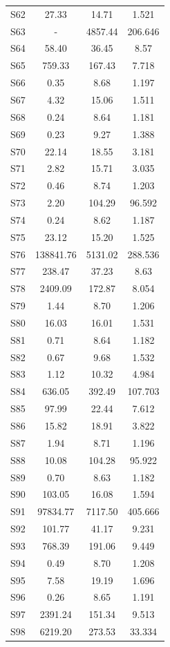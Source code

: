 {\begin{longtable}{l S[table-format=7.2] S[table-format=7.2] S[table-format=7.3]}
S62 & 27.33 & 14.71 & 1.521 \\
S63 & { - } & 4857.44 & 206.646 \\
S64 & 58.40 & 36.45 & 8.57 \\
S65 & 759.33 & 167.43 & 7.718 \\
S66 & 0.35 & 8.68 & 1.197 \\
S67 & 4.32 & 15.06 & 1.511 \\
S68 & 0.24 & 8.64 & 1.181 \\
S69 & 0.23 & 9.27 & 1.388 \\
S70 & 22.14 & 18.55 & 3.181 \\
S71 & 2.82 & 15.71 & 3.035 \\
S72 & 0.46 & 8.74 & 1.203 \\
S73 & 2.20 & 104.29 & 96.592 \\
S74 & 0.24 & 8.62 & 1.187 \\
S75 & 23.12 & 15.20 & 1.525 \\
S76 & 138841.76 & 5131.02 & 288.536 \\
S77 & 238.47 & 37.23 & 8.63 \\
S78 & 2409.09 & 172.87 & 8.054 \\
S79 & 1.44 & 8.70 & 1.206 \\
S80 & 16.03 & 16.01 & 1.531 \\
S81 & 0.71 & 8.64 & 1.182 \\
S82 & 0.67 & 9.68 & 1.532 \\
S83 & 1.12 & 10.32 & 4.984 \\
S84 & 636.05 & 392.49 & 107.703 \\
S85 & 97.99 & 22.44 & 7.612 \\
S86 & 15.82 & 18.91 & 3.822 \\
S87 & 1.94 & 8.71 & 1.196 \\
S88 & 10.08 & 104.28 & 95.922 \\
S89 & 0.70 & 8.63 & 1.182 \\
S90 & 103.05 & 16.08 & 1.594 \\
S91 & 97834.77 & 7117.50 & 405.666 \\
S92 & 101.77 & 41.17 & 9.231 \\
S93 & 768.39 & 191.06 & 9.449 \\
S94 & 0.49 & 8.70 & 1.208 \\
S95 & 7.58 & 19.19 & 1.696 \\
S96 & 0.26 & 8.65 & 1.191 \\
S97 & 2391.24 & 151.34 & 9.513 \\
S98 & 6219.20 & 273.53 & 33.334 \\

\end{longtable}}

